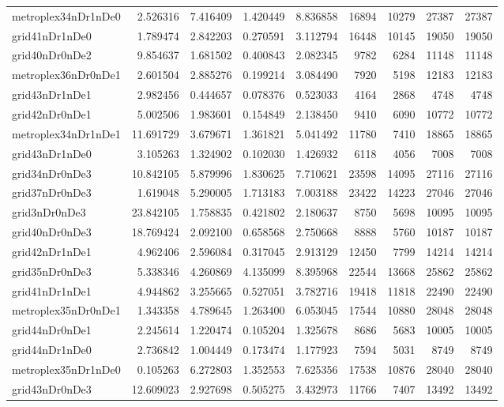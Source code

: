 \begin{longtable}{|l|r|r|r|r|r|r|r|r|}
metroplex34nDr1nDe0 & 2.526316 & 7.416409 & 1.420449 & 8.836858 & 16894 & 10279 & 27387 & 27387 \\
grid41nDr1nDe0 & 1.789474 & 2.842203 & 0.270591 & 3.112794 & 16448 & 10145 & 19050 & 19050 \\
grid40nDr0nDe2 & 9.854637 & 1.681502 & 0.400843 & 2.082345 & 9782 & 6284 & 11148 & 11148 \\
metroplex36nDr0nDe1 & 2.601504 & 2.885276 & 0.199214 & 3.084490 & 7920 & 5198 & 12183 & 12183 \\
grid43nDr1nDe1 & 2.982456 & 0.444657 & 0.078376 & 0.523033 & 4164 & 2868 & 4748 & 4748 \\
grid42nDr0nDe1 & 5.002506 & 1.983601 & 0.154849 & 2.138450 & 9410 & 6090 & 10772 & 10772 \\
metroplex34nDr1nDe1 & 11.691729 & 3.679671 & 1.361821 & 5.041492 & 11780 & 7410 & 18865 & 18865 \\
grid43nDr1nDe0 & 3.105263 & 1.324902 & 0.102030 & 1.426932 & 6118 & 4056 & 7008 & 7008 \\
grid34nDr0nDe3 & 10.842105 & 5.879996 & 1.830625 & 7.710621 & 23598 & 14095 & 27116 & 27116 \\
grid37nDr0nDe3 & 1.619048 & 5.290005 & 1.713183 & 7.003188 & 23422 & 14223 & 27046 & 27046 \\
grid3nDr0nDe3 & 23.842105 & 1.758835 & 0.421802 & 2.180637 & 8750 & 5698 & 10095 & 10095 \\
grid40nDr0nDe3 & 18.769424 & 2.092100 & 0.658568 & 2.750668 & 8888 & 5760 & 10187 & 10187 \\
grid42nDr1nDe1 & 4.962406 & 2.596084 & 0.317045 & 2.913129 & 12450 & 7799 & 14214 & 14214 \\
grid35nDr0nDe3 & 5.338346 & 4.260869 & 4.135099 & 8.395968 & 22544 & 13668 & 25862 & 25862 \\
grid41nDr1nDe1 & 4.944862 & 3.255665 & 0.527051 & 3.782716 & 19418 & 11818 & 22490 & 22490 \\
metroplex35nDr0nDe1 & 1.343358 & 4.789645 & 1.263400 & 6.053045 & 17544 & 10880 & 28048 & 28048 \\
grid44nDr0nDe1 & 2.245614 & 1.220474 & 0.105204 & 1.325678 & 8686 & 5683 & 10005 & 10005 \\
grid44nDr1nDe0 & 2.736842 & 1.004449 & 0.173474 & 1.177923 & 7594 & 5031 & 8749 & 8749 \\
metroplex35nDr1nDe0 & 0.105263 & 6.272803 & 1.352553 & 7.625356 & 17538 & 10876 & 28040 & 28040 \\
grid43nDr0nDe3 & 12.609023 & 2.927698 & 0.505275 & 3.432973 & 11766 & 7407 & 13492 & 13492 \\

\end{longtable}
